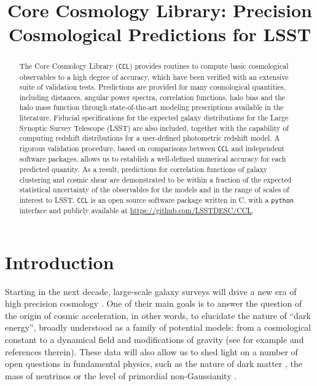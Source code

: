 \documentclass[\docopts]{\docclass}
\newcommand{\ccl}{{\tt CCL}\xspace}
\begin{document}
\title{Core Cosmology Library: Precision Cosmological Predictions for LSST}

\maketitlepre

\begin{abstract}

The Core Cosmology Library (\ccl) provides routines to compute basic cosmological observables to a high degree of accuracy, which have been verified with an extensive suite of validation tests. Predictions are provided for many cosmological quantities, including distances, angular power spectra, correlation functions, halo bias and the halo mass function through state-of-the-art modeling prescriptions available in the literature. Fiducial specifications for the expected galaxy distributions for the Large Synoptic Survey Telescope (LSST) are also included, together with the capability of computing redshift distributions for a user-defined photometric redshift model. A rigorous validation procedure, based on comparisons between \ccl and independent software packages, allows us to establish a well-defined numerical accuracy for each predicted quantity. As a result, predictions for correlation functions of galaxy clustering and cosmic shear are demonstrated to be within a fraction of the expected statistical uncertainty of the observables for the models and in the range of scales of interest to LSST. \ccl is an open source software package written in C, with a {\tt python} interface and publicly available at \url{https://github.com/LSSTDESC/CCL}. 

\end{abstract}

\maketitlepost



\section{Introduction}
\label{sec:intro}

Starting in the next decade, large-scale galaxy surveys will drive a new era of high precision cosmology \citep{DESCWhite,green11,Laureijs11}. One of their main goals is to answer the question of the origin of cosmic acceleration, in other words, to elucidate the nature of ``dark energy'', broadly understood as a family of potential models: from a cosmological constant to a dynamical field and modifications of gravity (see for example  \citealt{Carroll2001CC,Peebles2003,Padmanabhan2003,Copeland2006,Ishak2007,Weinberg13} and references therein). These data will also allow us to shed light on a number of open questions in fundamental physics, such as the nature of dark matter \citep{Feng10,Porter11}, the mass of neutrinos \citep{Wong11,Lesgourgues12,Allison15} or the level of primordial non-Gaussianity \citep{Dalal08,Desjacques10}.
\end{document}
